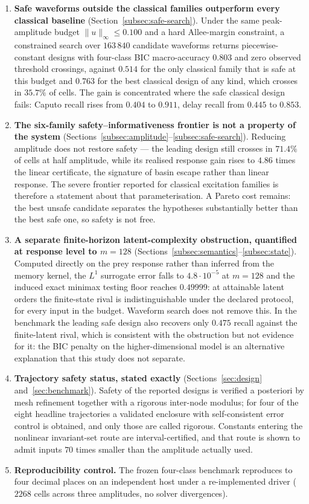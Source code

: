 \begin{enumerate}
    \item \textbf{Safe waveforms outside the classical families outperform every classical baseline} (Section~\ref{subsec:safe-search}). Under the same peak-amplitude budget $\|u\|_\infty\le0.100$ and a hard Allee-margin constraint, a constrained search over $163\,840$ candidate waveforms returns piecewise-constant designs with four-class BIC macro-accuracy $0.803$ and zero observed threshold crossings, against $0.514$ for the only classical family that is safe at this budget and $0.763$ for the best classical design of any kind, which crosses in $35.7\%$ of cells. The gain is concentrated where the safe classical design fails: Caputo recall rises from $0.404$ to $0.911$, delay recall from $0.445$ to $0.853$.
    \item \textbf{The six-family safety--informativeness frontier is not a property of the system} (Sections~\ref{subsec:amplitude}--\ref{subsec:safe-search}). Reducing amplitude does not restore safety --- the leading design still crosses in $71.4\%$ of cells at half amplitude, while its realised response gain rises to $4.86$ times the linear certificate, the signature of basin escape rather than linear response. The severe frontier reported for classical excitation families is therefore a statement about that parameterisation. A Pareto cost remains: the best unsafe candidate separates the hypotheses substantially better than the best safe one, so safety is not free.
    \item \textbf{A separate finite-horizon latent-complexity obstruction, quantified at response level to $m=128$} (Sections~\ref{subsec:semantics}--\ref{subsec:state}). Computed directly on the prey response rather than inferred from the memory kernel, the $L^1$ surrogate error falls to $4.8\cdot10^{-5}$ at $m=128$ and the induced exact minimax testing floor reaches $0.49999$: at attainable latent orders the finite-state rival is indistinguishable under the declared protocol, for every input in the budget. Waveform search does not remove this. In the benchmark the leading safe design also recovers only $0.475$ recall against the finite-latent rival, which is consistent with the obstruction but not evidence for it: the BIC penalty on the higher-dimensional model is an alternative explanation that this study does not separate.
    \item \textbf{Trajectory safety status, stated exactly} (Sections~\ref{sec:design} and~\ref{sec:benchmark}). Safety of the reported designs is verified a posteriori by mesh refinement together with a rigorous inter-node modulus; for four of the eight headline trajectories a validated enclosure with self-consistent error control is obtained, and only those are called rigorous. Constants entering the nonlinear invariant-set route are interval-certified, and that route is shown to admit inputs $70$ times smaller than the amplitude actually used.
    \item \textbf{Reproducibility control.} The frozen four-class benchmark reproduces to four decimal places on an independent host under a re-implemented driver ($2268$ cells across three amplitudes, no solver divergences).
\end{enumerate}

